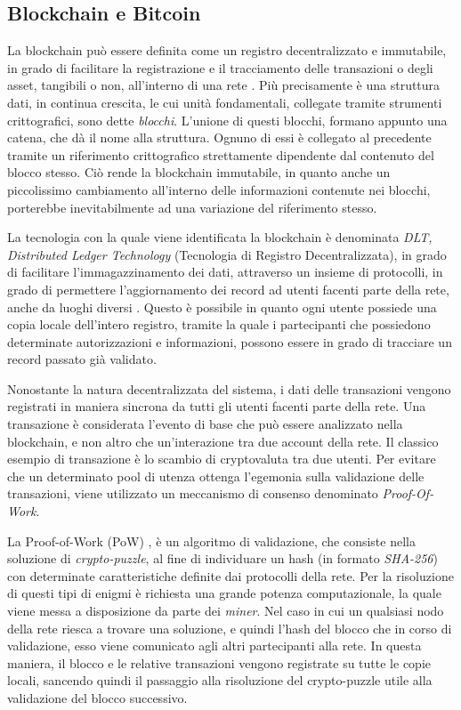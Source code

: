 \subsection{Blockchain e Bitcoin}
La blockchain può essere definita come un registro  decentralizzato e immutabile, in grado di facilitare la registrazione e il tracciamento delle transazioni o degli asset, tangibili o non, all'interno di una rete \cite{blockchain-ibm}.
Più precisamente è una struttura dati, in continua crescita, le cui unità fondamentali, collegate tramite strumenti crittografici, sono dette  \emph{blocchi}.
L'unione di questi blocchi, formano appunto una catena, che dà il nome alla struttura.
Ognuno di essi è collegato al precedente tramite un riferimento crittografico strettamente dipendente dal contenuto del blocco stesso. Ciò rende la blockchain immutabile, in quanto anche un piccolissimo cambiamento all'interno delle informazioni contenute nei blocchi, porterebbe inevitabilmente ad una variazione del riferimento 
stesso. 

La tecnologia con la quale viene identificata la blockchain è denominata \emph{DLT, Distributed Ledger Technology} (Tecnologia di Registro Decentralizzata), in grado di facilitare l'immagazzinamento dei dati, attraverso un insieme di protocolli, in grado di permettere l'aggiornamento dei record ad utenti  facenti parte della rete, anche da luoghi diversi \cite{blockchain-DLT-digGovernment}.
Questo è possibile in quanto ogni utente possiede una copia locale dell'intero registro, tramite la quale i partecipanti che possiedono determinate autorizzazioni e informazioni, possono essere in grado di tracciare un record passato già validato.

Nonostante la natura decentralizzata del sistema, i dati delle transazioni vengono registrati in maniera sincrona da tutti gli utenti facenti parte della rete. 
\thispagestyle{mystyle}
Una transazione è considerata l'evento di base che può essere analizzato nella blockchain, e non altro che un'interazione tra due account della rete.
Il classico esempio di transazione è lo scambio  di cryptovaluta tra due utenti.
Per evitare che un determinato pool di utenza ottenga l'egemonia sulla validazione delle transazioni, viene utilizzato un meccanismo di consenso denominato \textit{Proof-Of-Work}.

La Proof-of-Work (PoW) \cite{bitcoin-paper}, è un algoritmo di validazione, che consiste nella soluzione di \textit{crypto-puzzle}, al fine di individuare un hash (in formato \textit{SHA-256}) con determinate caratteristiche definite dai protocolli della rete.
Per la risoluzione di questi tipi di enigmi è richiesta una grande potenza computazionale, la quale viene messa a disposizione da parte dei \textit{miner}. Nel caso in cui un qualsiasi nodo della rete riesca a trovare una soluzione, e quindi l'hash del blocco che in corso di validazione, esso viene comunicato agli altri partecipanti alla rete.
In questa maniera, il blocco e le relative transazioni vengono registrate su tutte le copie locali, sancendo quindi il passaggio alla risoluzione del crypto-puzzle utile alla validazione del blocco successivo.


